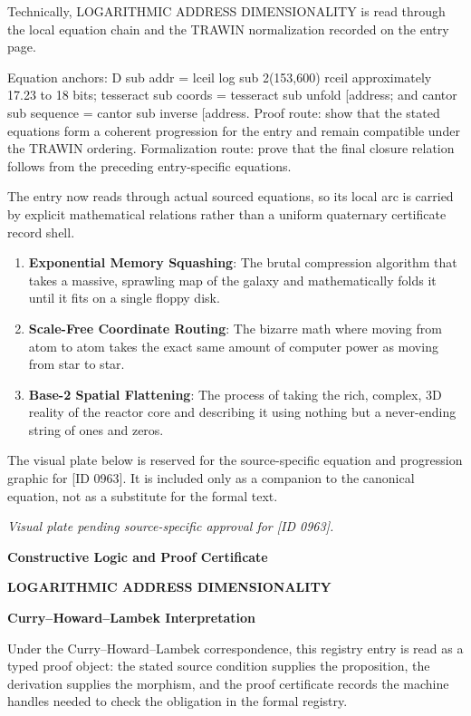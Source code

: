 Technically, LOGARITHMIC ADDRESS DIMENSIONALITY is read through the local equation chain and the TRAWIN normalization recorded on the entry page.

Equation anchors: D sub addr = lceil log sub 2(153,600) rceil approximately 17.23 to 18 bits; tesseract sub coords = tesseract sub unfold [address; and cantor sub sequence = cantor sub inverse [address. Proof route: show that the stated equations form a coherent progression for the entry and remain compatible under the TRAWIN ordering. Formalization route: prove that the final closure relation follows from the preceding entry-specific equations.

The entry now reads through actual sourced equations, so its local arc is carried by explicit mathematical relations rather than a uniform quaternary certificate record shell.
\endgroup

\begin{enumerate}[leftmargin=1.6em,itemsep=6pt,topsep=4pt]
\item \textbf{Exponential Memory Squashing}: The brutal compression algorithm that takes a massive, sprawling map of the galaxy and mathematically folds it until it fits on a single floppy disk.
\item \textbf{Scale-Free Coordinate Routing}: The bizarre math where moving from atom to atom takes the exact same amount of computer power as moving from star to star.
\item \textbf{Base-2 Spatial Flattening}: The process of taking the rich, complex, 3D reality of the reactor core and describing it using nothing but a never-ending string of ones and zeros.
\end{enumerate}

\begingroup\footnotesize\sloppy
The visual plate below is reserved for the source-specific equation and progression graphic for [ID 0963]. It is included only as a companion to the canonical equation, not as a substitute for the formal text.
\par\endgroup
\begingroup\footnotesize\itshape
Visual plate pending source-specific approval for [ID 0963].
\par\endgroup

\clearpage
\begingroup\tzpsupportsetup
\noindent\textbf{\fontsize{10.8pt}{12.8pt}\selectfont [ID 0963] Constructive Logic and Proof Certificate}\par
\noindent\textbf{\fontsize{10pt}{12pt}\selectfont LOGARITHMIC ADDRESS DIMENSIONALITY}\par
\vspace{0.45em}
\begingroup
\footnotesize
\setlength{\parskip}{0.22em}
\setlength{\parindent}{0pt}
\noindent\textbf{Curry--Howard--Lambek Interpretation}\par
Under the Curry--Howard--Lambek correspondence, this registry entry is read as a typed proof
object: the stated source condition supplies the proposition, the derivation supplies the
morphism, and the proof certificate records the machine handles needed to check the obligation
in the formal registry.

